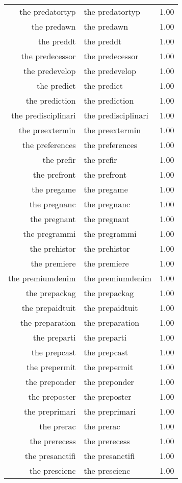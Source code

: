 \begin{table}[ht]
\begin{tabular}{rlr}
  the predatortyp & the predatortyp & 1.00 \\ 
  the predawn & the predawn & 1.00 \\ 
  the preddt & the preddt & 1.00 \\ 
  the predecessor & the predecessor & 1.00 \\ 
  the predevelop & the predevelop & 1.00 \\ 
  the predict & the predict & 1.00 \\ 
  the prediction & the prediction & 1.00 \\ 
  the predisciplinari & the predisciplinari & 1.00 \\ 
  the preextermin & the preextermin & 1.00 \\ 
  the preferences & the preferences & 1.00 \\ 
  the prefir & the prefir & 1.00 \\ 
  the prefront & the prefront & 1.00 \\ 
  the pregame & the pregame & 1.00 \\ 
  the pregnanc & the pregnanc & 1.00 \\ 
  the pregnant & the pregnant & 1.00 \\ 
  the pregrammi & the pregrammi & 1.00 \\ 
  the prehistor & the prehistor & 1.00 \\ 
  the premiere & the premiere & 1.00 \\ 
  the premiumdenim & the premiumdenim & 1.00 \\ 
  the prepackag & the prepackag & 1.00 \\ 
  the prepaidtuit & the prepaidtuit & 1.00 \\ 
  the preparation & the preparation & 1.00 \\ 
  the preparti & the preparti & 1.00 \\ 
  the prepcast & the prepcast & 1.00 \\ 
  the prepermit & the prepermit & 1.00 \\ 
  the preponder & the preponder & 1.00 \\ 
  the preposter & the preposter & 1.00 \\ 
  the preprimari & the preprimari & 1.00 \\ 
  the prerac & the prerac & 1.00 \\ 
  the prerecess & the prerecess & 1.00 \\ 
  the presanctifi & the presanctifi & 1.00 \\ 
  the prescienc & the prescienc & 1.00 \\ 

\end{tabular}
\end{table}
